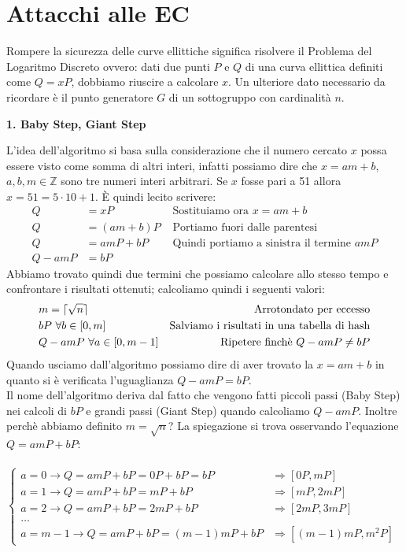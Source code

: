\documentclass[a4paper,12pt]{tesiinfo}
\DeclarePairedDelimiter\ceil{\lceil}{\rceil}
\begin{document}
\chapter{Attacchi alle EC}
Rompere la sicurezza delle curve ellittiche significa risolvere il Problema del Logaritmo Discreto ovvero: dati due punti $P$ e $Q$ di una curva ellittica definiti come $Q = xP$, dobbiamo riuscire a calcolare $x$. Un ulteriore dato necessario da ricordare \`e il punto generatore $G$ di un sottogruppo con cardinalit\`a $n$.
\\
\begin{center}
    \textbf{1. Baby Step, Giant Step}
\end{center}
L'idea dell'algoritmo si basa sulla considerazione che il numero cercato $x$ possa essere visto come somma di altri interi, infatti possiamo dire che $x = am+b$, $a, b, m \in \mathbb{Z}$ sono tre numeri interi arbitrari. Se $x$ fosse pari a 51 allora $x = 51 = 5 \cdot 10 + 1$. \`E quindi lecito scrivere:
\begin{align*}
    Q &= xP &\text{ Sostituiamo ora }x = am+b\\
    Q &= (am+b)P &\text{ Portiamo fuori dalle parentesi }\\
    Q &= amP+bP &\text{ Quindi portiamo a sinistra il termine }amP\\
    Q -amP &= bP
\end{align*}
Abbiamo trovato quindi due termini che possiamo calcolare allo stesso tempo e confrontare i risultati ottenuti; calcoliamo quindi i seguenti valori:
\begin{align*}
    &m = \ceil{\sqrt{n}} &\text{Arrotondato per eccesso}\\
    &bP \text{ }\forall b \in [0, m] &\text{Salviamo i risultati in una tabella di hash}\\
    &Q -amP \text{ }\forall a \in [0, m-1] &\text{Ripetere finch\`e } Q -amP \ne bP
\end{align*}
Quando usciamo dall'algoritmo possiamo dire di aver trovato la $x = am+b$ in quanto si \`e verificata l'uguaglianza $Q -amP = bP$.
\\
Il nome dell'algoritmo deriva dal fatto che vengono fatti piccoli passi (Baby Step) nei calcoli di $bP$ e grandi passi (Giant Step) quando calcoliamo $Q-amP$. Inoltre perch\`e abbiamo definito $m = \sqrt{n}$? La spiegazione si trova osservando l'equazione $Q = amP+bP$:\\
\\
$\begin{cases}
    a = 0 \to Q=amP+bP=0P+bP=bP &\Rightarrow [0P, mP]\\
    a = 1 \to Q=amP+bP=mP+bP &\Rightarrow  [mP, 2mP]\\
    a = 2 \to Q=amP+bP=2mP+bP &\Rightarrow  [2mP, 3mP]\\
    \ldots\\
    a = m-1 \to Q=amP+bP=(m-1)mP+bP &\Rightarrow  [(m-1)mP, m^2P]
\end{cases}$
\end{document}
